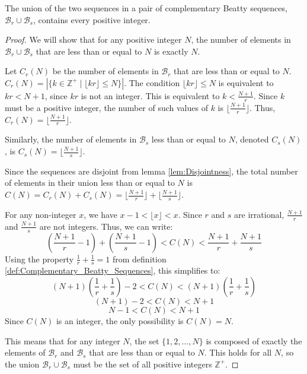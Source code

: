 \begin{lemma}
    \label{lem:Completeness}
    The union of the two sequences in a pair of complementary Beatty sequences, $\mathcal{B}_r \cup \mathcal{B}_s$, contains every positive integer.
\end{lemma}

\begin{proof}
    We will show that for any positive integer $N$, the number of elements in $\mathcal{B}_r \cup \mathcal{B}_s$ that are less than or equal to $N$ is exactly $N$.

    Let $C_r(N)$ be the number of elements in $\mathcal{B}_r$ that are less than or equal to $N$.
    $C_r(N) = |\{k \in \mathbb{Z}^+ \mid \lfloor kr \rfloor \le N \}|$.
    The condition $\lfloor kr \rfloor \le N$ is equivalent to $kr < N+1$, since $kr$ is not an integer. This is equivalent to $k < \frac{N+1}{r}$.
    Since $k$ must be a positive integer, the number of such values of $k$ is $\lfloor \frac{N+1}{r} \rfloor$.
    Thus, $C_r(N) = \lfloor \frac{N+1}{r} \rfloor$.

    Similarly, the number of elements in $\mathcal{B}_s$ less than or equal to $N$, denoted $C_s(N)$, is $C_s(N) = \lfloor \frac{N+1}{s} \rfloor$.

    Since the sequences are disjoint from lemma \ref{lem:Disjointness}, the total number of elements in their union less than or equal to $N$ is $C(N) = C_r(N) + C_s(N) = \lfloor \frac{N+1}{r} \rfloor + \lfloor \frac{N+1}{s} \rfloor$.

    For any non-integer $x$, we have $x-1 < \lfloor x \rfloor < x$. Since $r$ and $s$ are irrational, $\frac{N+1}{r}$ and $\frac{N+1}{s}$ are not integers. Thus, we can write:
    \[
    \left(\frac{N+1}{r} - 1\right) + \left(\frac{N+1}{s} - 1\right) < C(N) < \frac{N+1}{r} + \frac{N+1}{s}
    \]
    Using the property $\frac{1}{r} + \frac{1}{s} = 1$ from definition \ref{def:Complementary_Beatty_Sequences}, this simplifies to:
    \[
    (N+1)\left(\frac{1}{r} + \frac{1}{s}\right) - 2 < C(N) < (N+1)\left(\frac{1}{r} + \frac{1}{s}\right)
    \]
    \[
    (N+1) - 2 < C(N) < N+1
    \]
    \[
    N-1 < C(N) < N+1
    \]
    Since $C(N)$ is an integer, the only possibility is $C(N) = N$.

    This means that for any integer $N$, the set $\{1, 2, \dots, N\}$ is composed of exactly the elements of $\mathcal{B}_r$ and $\mathcal{B}_s$ that are less than or equal to $N$. This holds for all $N$, so the union $\mathcal{B}_r \cup \mathcal{B}_s$ must be the set of all positive integers $\mathbb{Z}^+$.
\end{proof}

